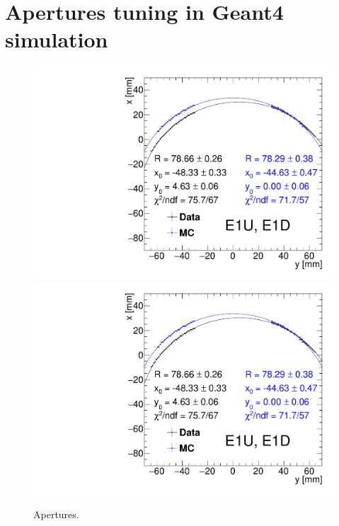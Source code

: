 
\chapter{Apertures tuning in Geant4 simulation}\label{appendix:g4ApertureTuning}

\begin{figure}[hb]\centering%
\caption[Apertures.]{Apertures.}\label{fig:aperturesWithFit}%
\parbox{0.495\textwidth}{
  \centering
  \includegraphics[width=\linewidth,page=2]{graphics/rpSim/Apertures_swapedAxes_withFit_beforeDxShift.pdf}\\
  \includegraphics[width=\linewidth,page=3]{graphics/rpSim/Apertures_swapedAxes_withFit_beforeDxShift.pdf}\\
}
\end{figure}
